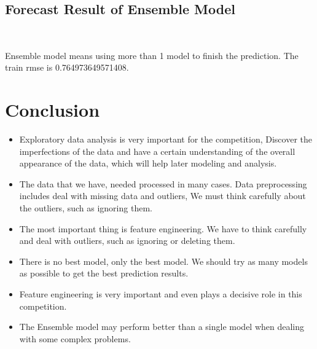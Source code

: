 \subsection{Forecast Result of Ensemble Model }
\

Ensemble model means using 
more than 1 model to finish the prediction.
The train rmse is 0.764973649571408.

\section{Conclusion}

\begin{itemize}
	\item Exploratory data analysis is 
	very important for the competition,
	Discover the imperfections of the 
	data and have a certain understanding 
	of the overall appearance of the data, 
	which will help later modeling and analysis. 
	\item The data that we have,
	needed processed in many cases.
	Data preprocessing includes 
	deal with missing data and outliers, 
	We must think carefully about the outliers, 
	such as ignoring them.
	\item The most important thing is
	feature engineering.
	We have to think carefully and 
	deal with outliers, such as ignoring 
	or deleting them.
	\item There is no best model, 
	only the best model. We should 
	try as many models as possible to 
	get the best prediction results. 
	\item Feature engineering is very 
	important and even plays a decisive 
	role in this competition.
	\item The Ensemble model may perform better 
	than a single model when dealing 
	with some complex problems.	
\end{itemize}











